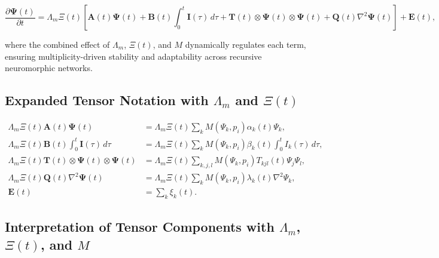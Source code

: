 \documentclass[12pt]{article}
\theoremstyle{plain}
\begin{document}
\begin{equation}
\frac{\partial \bm{\Psi}(t)}{\partial t} = \Lambda_m \Xi(t) \left[ \bm{A}(t) \bm{\Psi}(t) + \bm{B}(t) \int_0^t \bm{I}(\tau) \, d\tau + \bm{T}(t) \otimes \bm{\Psi}(t) \otimes \bm{\Psi}(t) + \bm{Q}(t) \nabla^2 \bm{\Psi}(t) \right] + \bm{E}(t),
\end{equation}


where the combined effect of \(\Lambda_m\), \(\Xi(t)\), and \(M\) dynamically regulates each term, ensuring multiplicity-driven stability and adaptability across recursive neuromorphic networks.


\subsection{Expanded Tensor Notation with \(\Lambda_m\) and \(\Xi(t)\)}


\begin{align}
\Lambda_m \Xi(t) \bm{A}(t) \bm{\Psi}(t) &= \Lambda_m \Xi(t) \sum_k M(\Psi_k, p_i) \alpha_k(t) \Psi_k, \\
\Lambda_m \Xi(t) \bm{B}(t) \int_0^t \bm{I}(\tau) \, d\tau &= \Lambda_m \Xi(t) \sum_k M(\Psi_k, p_i) \beta_k(t) \int_0^t I_k(\tau) \, d\tau, \\
\Lambda_m \Xi(t) \bm{T}(t) \otimes \bm{\Psi}(t) \otimes \bm{\Psi}(t) &= \Lambda_m \Xi(t) \sum_{k,j,l} M(\Psi_k, p_i) T_{kjl}(t) \Psi_j \Psi_l, \\
\Lambda_m \Xi(t) \bm{Q}(t) \nabla^2 \bm{\Psi}(t) &= \Lambda_m \Xi(t) \sum_k M(\Psi_k, p_i) \lambda_k(t) \nabla^2 \Psi_k, \\
\bm{E}(t) &= \sum_k \xi_k(t).
\end{align}


\subsection{Interpretation of Tensor Components with \(\Lambda_m\), \(\Xi(t)\), and \(M\)}
\end{document}
